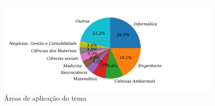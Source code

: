 \begin{figure}[htpb!]
	\centering
	\caption{Áreas de aplicação do tema}
	\label{fig:areas}
	\includegraphics[width=0.9\linewidth]{Revisao/Figuras/areas}
	
	
\end{figure}
